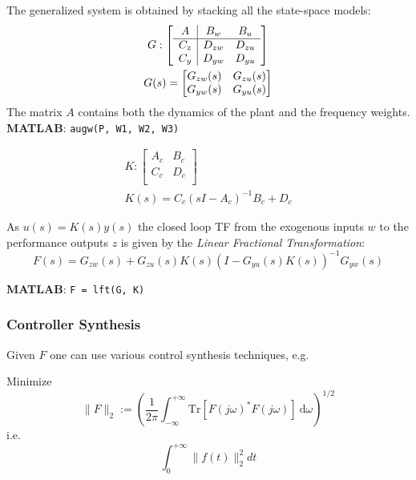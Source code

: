 The generalized system is obtained by stacking all the state-space models:
\begin{gather*}
    G : \left[
        \begin{array}{c|c c} %
            A   & B_w    & B_u    \\
            \hline %
            C_z & D_{zw} & D_{zu} \\
            C_y & D_{yw} & D_{yu}
        \end{array}
        \right]                        \\
    G(s) = \begin{bmatrix}
        G_{zw}(s) & G_{zu}(s) \\
        G_{yw}(s) & G_{yu}(s) \\
    \end{bmatrix}
\end{gather*}
The matrix $A$ contains both the dynamics of the plant and the frequency weights.\\
\textbf{MATLAB}: \texttt{augw(P, W1, W2, W3)}

\newpar{}
\begin{gather*}
    K : \left[
        \begin{array}{c|c} %
            A_c & B_c \\
            \hline %
            C_c & D_c \\
        \end{array}
        \right]                            \\
    K(s) = {C_c(sI-A_c)}^{-1}B_c+D_c
\end{gather*}

As $u(s)=K(s)y(s)$ the closed loop TF from the exogenous inputs $w$ to the performance outputs $z$ is given by the \textit{Linear Fractional Transformation}:
\begin{equation*}
    F(s) = G_{zw}(s) + G_{zu}(s)K(s){(I-G_{yu}(s) K(s))}^{-1}G_{yw}(s)
\end{equation*}

\textbf{MATLAB}: \texttt{F = lft(G, K)}

\subsubsection{Controller Synthesis}
Given $F$ one can use various control synthesis techniques, e.g.\
\newpar{}

Minimize
\begin{equation*}
    \|F\|_{2}:={\left(\frac{1}{2\pi}\int_{-\infty}^{+\infty}\mathrm{Tr}[{F(j\omega)}^{*}F(j\omega)]\mathrm{~d}\omega\right)}^{1/2}
\end{equation*}
i.e.\
\begin{equation*}
    \int_0^{+\infty}\|f(t)\|_2^2dt
\end{equation*}

